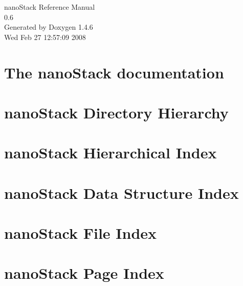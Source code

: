 \documentclass[a4paper]{book}
\begin{document}
\begin{titlepage}
\vspace*{7cm}
\begin{center}
{\Large nano\-Stack Reference Manual\\[1ex]\large 0.6 }\\
\vspace*{1cm}
{\large Generated by Doxygen 1.4.6}\\
\vspace*{0.5cm}
{\small Wed Feb 27 12:57:09 2008}\\
\end{center}
\end{titlepage}
\clearemptydoublepage
{}
\tableofcontents
\clearemptydoublepage
{}
\chapter{The nano\-Stack documentation }
\label{index}\hypertarget{index}{}
\chapter{nano\-Stack Directory Hierarchy}

\chapter{nano\-Stack Hierarchical Index}

\chapter{nano\-Stack Data Structure Index}

\chapter{nano\-Stack File Index}

\chapter{nano\-Stack Page Index}

\end{document}
